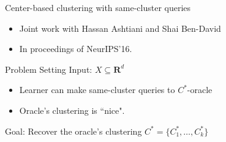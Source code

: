 \documentclass{beamer}
\newcommand{\mb}{\mathbf}
\begin{document}
\begin{frame}{Center-based clustering with same-cluster queries}
	\begin{itemize}
		\item Joint work with Hassan Ashtiani and Shai Ben-David
		\vspace{20pt} \item In proceedings of \alert{NeurIPS'16}.
	\end{itemize}
\end{frame}

\begin{frame}{Problem Setting}
	Input: $X \subseteq \mb R^d$
	\begin{itemize} 
   		\vspace{10pt}\item Learner can make same-cluster queries to $C^*$-oracle
		\vspace{10pt}\item Oracle's clustering is ``nice".     
	\end{itemize}
	\vspace{20pt} {\color{blue}Goal}: Recover the oracle's clustering $C^* = \{C_1^*, \ldots, C_k^*\}$
\end{frame}
\end{document}
